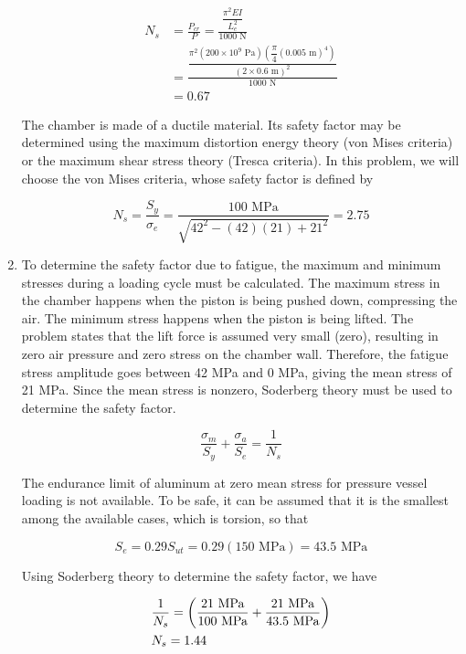\documentclass[
10pt,
a4paper,
openany,
svgnames,
]{book}
\begin{document}
\begin{enumerate}
\begin{align*}
  N_s &= \frac{P_{cr}}{P} = \frac{\dfrac{\pi ^2 EI}{L_e^2}}{1000\text{ N}} \\[0.5em] 
      &= \frac{\dfrac{\pi ^2 (200 \times 10^9 \text{ Pa}) \left( \dfrac{\pi }{4}(0.005\text{ m})^4 \right)}{(2 \times 0.6\text{ m})^2}}{1000\text{ N}} \\[0.5em] 
      &= 0.67
\end{align*}

The chamber is made of a ductile material. Its safety factor may be determined using the maximum distortion energy theory (von Mises criteria) or the maximum shear stress theory (Tresca criteria). In this problem, we will choose the von Mises criteria, whose safety factor is defined by

\[N_s = \frac{S_y}{\sigma_e} = \frac{100\text{ MPa}}{\sqrt {42^2 - (42)(21) + 21^2}} = 2.75\]

\item To determine the safety factor due to fatigue, the maximum and minimum stresses during a loading cycle must be calculated. The maximum stress in the chamber happens when the piston is being pushed down, compressing the air. The minimum stress happens when the piston is being lifted. The problem states that the lift force is assumed very small (zero), resulting in zero air pressure and zero stress on the chamber wall. Therefore, the fatigue stress amplitude goes between 42 MPa and 0 MPa, giving the mean stress of 21 MPa. Since the mean stress is nonzero, Soderberg theory must be used to determine the safety factor.
  
  \[\frac{\sigma _m}{S_y} + \frac{\sigma _a}{S_e} = \frac{1}{N_s}\]
  
  The endurance limit of aluminum at zero mean stress for pressure vessel loading is not available. To be safe, it can be assumed that it is the smallest among the available cases, which is torsion, so that
  
  \[S_e = 0.29S _{ut} = 0.29(150\text{ MPa}) = 43.5\text{ MPa}\]
  
  Using Soderberg theory to determine the safety factor, we have
  
  \[\begin{gathered}
      \frac{1}{N_s} = \left( \frac{21\text{ MPa}}{100\text{ MPa}} + \frac{21\text{ MPa}}{43.5\text{ MPa}} \right) \hfill \\
      N_s = 1.44 \hfill \\ 
    \end{gathered} \]
\end{enumerate}
\end{document}
